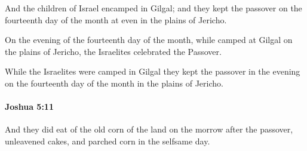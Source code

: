 			\begin{versebox}
					\item[BHS] 
					\item[ASV] And the children of Israel encamped in Gilgal; and they kept the passover on the fourteenth day of the month at even in the plains of Jericho.
					\item[NIV] On the evening of the fourteenth day of the month, while camped at Gilgal on the plains of Jericho, the Israelites celebrated the Passover.
					\item[NRSV] While the Israelites were camped in Gilgal they kept the passover in the evening on the fourteenth day of the month in the plains of Jericho.
			\end{versebox}

		\paragraph{Joshua 5:11} %
			\label{JOSHUA-5-11}

			And they did eat of the old corn of the land on the morrow after the passover, unleavened cakes, and parched corn in the selfsame day.

